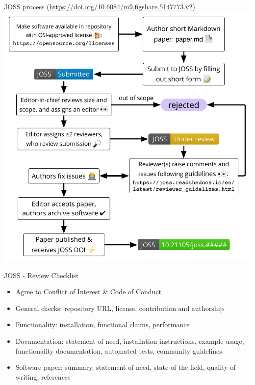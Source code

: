     
\begin{frame}{JOSS process {\tiny(\url{https://doi.org/10.6084/m9.figshare.5147773.v2})}}
    \centering
    \includegraphics[scale=0.5]{JOSS-flowchart-updated.pdf}
\end{frame}

\begin{frame}{JOSS - Review Checklist}

\begin{itemize}
    \item Agree to Conflict of Interest \& Code of Conduct
    \item General checks: repository URL, license,
contribution and authorship
    \item Functionality: installation, functional claims,
performance
\item Documentation: statement of need, installation
instructions, example usage, functionality
documentation, automated tests, community
guidelines
\item Software paper: summary, statement of need,
state of the field, quality of writing, references
\end{itemize}
    
\end{frame}



